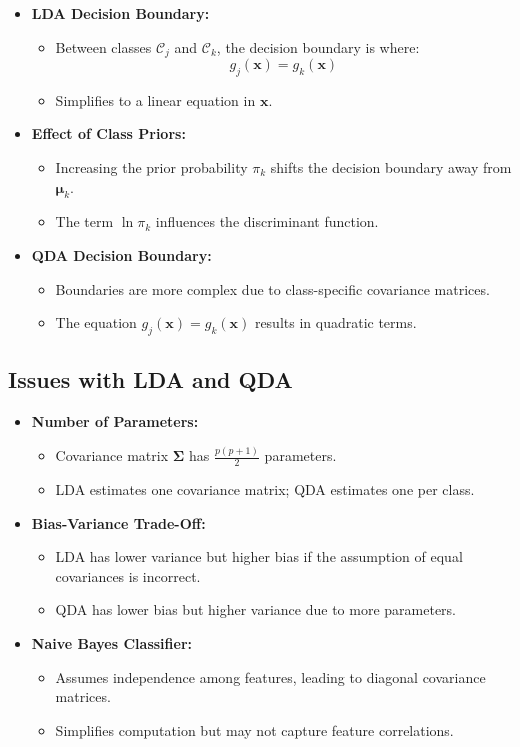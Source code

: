 \documentclass{article}
\begin{document}
\begin{itemize}
    \item \textbf{LDA Decision Boundary:}
    \begin{itemize}
        \item Between classes $\mathcal{C}_j$ and $\mathcal{C}_k$, the decision boundary is where:
        \[
        g_j(\mathbf{x}) = g_k(\mathbf{x})
        \]
        \item Simplifies to a linear equation in $\mathbf{x}$.
    \end{itemize}
    \item \textbf{Effect of Class Priors:}
    \begin{itemize}
        \item Increasing the prior probability $\pi_k$ shifts the decision boundary away from $\boldsymbol{\mu}_k$.
        \item The term $\ln \pi_k$ influences the discriminant function.
    \end{itemize}
    \item \textbf{QDA Decision Boundary:}
    \begin{itemize}
        \item Boundaries are more complex due to class-specific covariance matrices.
        \item The equation $g_j(\mathbf{x}) = g_k(\mathbf{x})$ results in quadratic terms.
    \end{itemize}
\end{itemize}

\subsection{Issues with LDA and QDA}

\begin{itemize}
    \item \textbf{Number of Parameters:}
    \begin{itemize}
        \item Covariance matrix $\boldsymbol{\Sigma}$ has $\frac{p(p+1)}{2}$ parameters.
        \item LDA estimates one covariance matrix; QDA estimates one per class.
    \end{itemize}
    \item \textbf{Bias-Variance Trade-Off:}
    \begin{itemize}
        \item LDA has lower variance but higher bias if the assumption of equal covariances is incorrect.
        \item QDA has lower bias but higher variance due to more parameters.
    \end{itemize}
    \item \textbf{Naive Bayes Classifier:}
    \begin{itemize}
        \item Assumes independence among features, leading to diagonal covariance matrices.
        \item Simplifies computation but may not capture feature correlations.
    \end{itemize}
\end{itemize}
\end{document}
